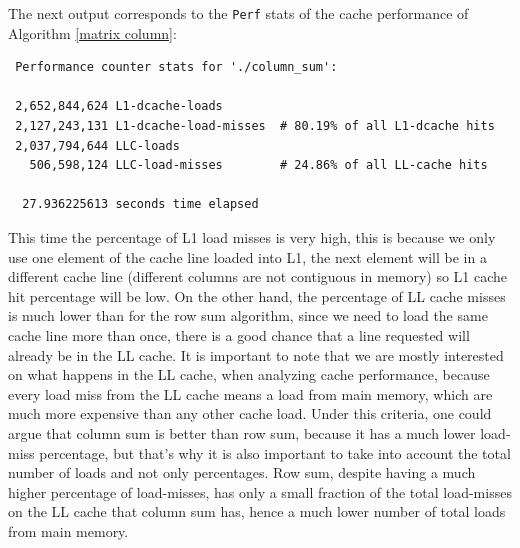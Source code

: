\documentclass[12pt]{diicc}
\begin{document}
The next output corresponds to the \texttt{Perf} stats of the cache performance of Algorithm \ref{matrix column}:

\begin{verbatim}
 Performance counter stats for './column_sum':                                                                                                              
                                                                                                                                                              
 2,652,844,624 L1-dcache-loads                                                                                                        
 2,127,243,131 L1-dcache-load-misses  # 80.19% of all L1-dcache hits                                                                 
 2,037,794,644 LLC-loads                                                                                                              
   506,598,124 LLC-load-misses        # 24.86% of all LL-cache hits                                                                  
                                                                                                                                                              
  27.936225613 seconds time elapsed
\end{verbatim} 

This time the percentage of L1 load misses is very high, this is because we only use one element of the cache line loaded into L1, the next element will be in a different cache line (different columns are not contiguous in memory) so L1 cache hit percentage will be low. On the other hand, the percentage of LL cache misses is much lower than for the row sum algorithm, since we need to load the same cache line more than once, there is a good chance that a line requested will already be in the LL cache. It is important to note that we are mostly interested on what happens in the LL cache, when analyzing cache performance, because every load miss from the LL cache means a load from main memory, which are much more expensive than any other cache load. Under this criteria, one could argue that column sum is better than row sum, because it has a much lower load-miss percentage, but that's why it is also important to take into account the total number of loads and not only percentages. Row sum, despite having a much higher percentage of load-misses, has only a small fraction of the total load-misses on the LL cache that column sum has, hence a much lower number of total loads from main memory.
\end{document}

